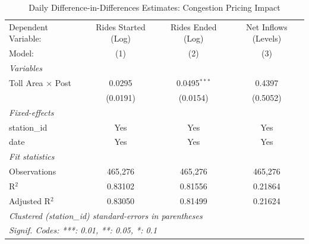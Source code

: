 
\begin{table}[htbp]
   \caption{\label{tab:did_static_daily} Daily Difference-in-Differences Estimates: Congestion Pricing Impact}
   \centering
   \begin{tabular}{lccc}
      \tabularnewline \midrule \midrule
      Dependent Variable:      & Rides Started (Log) & Rides Ended (Log) & Net Inflows (Levels) \\   
      Model:                   & (1)                 & (2)               & (3)\\  
      \midrule
      \emph{Variables}\\
      Toll Area $\times$ Post  & 0.0295              & 0.0495$^{***}$    & 0.4397\\   
                               & (0.0191)            & (0.0154)          & (0.5052)\\   
      \midrule
      \emph{Fixed-effects}\\
      station\_id              & Yes                 & Yes               & Yes\\  
      date                     & Yes                 & Yes               & Yes\\  
      \midrule
      \emph{Fit statistics}\\
      Observations             & 465,276             & 465,276           & 465,276\\  
      R$^2$                    & 0.83102             & 0.81556           & 0.21864\\  
      Adjusted R$^2$           & 0.83050             & 0.81499           & 0.21624\\  
      \midrule \midrule
      \multicolumn{4}{l}{\emph{Clustered (station\_id) standard-errors in parentheses}}\\
      \multicolumn{4}{l}{\emph{Signif. Codes: ***: 0.01, **: 0.05, *: 0.1}}\\
   \end{tabular}
\end{table}


